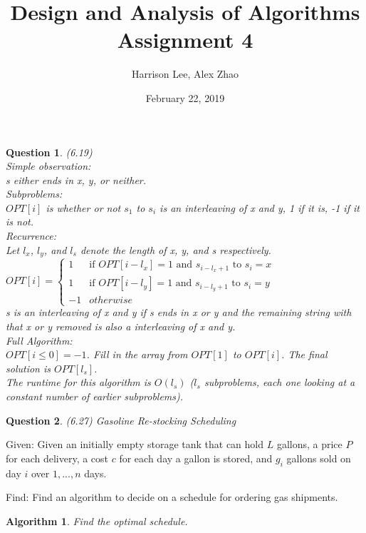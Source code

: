 \documentclass[11pt, oneside]{article}   	%
\title {Design and Analysis of Algorithms Assignment 4}
\author{Harrison Lee, Alex Zhao}
\date{February 22, 2019}
\newtheorem{Question}{Question}
\newtheorem{Algorithm}{Algorithm}
\begin{document}
\maketitle

\begin{Question} (6.19) \smallskip \\
Simple observation:  \\
s either ends in x, y, or neither. \bigskip \\
Subproblems: \\
$OPT[i]$ is whether or not $s_1$ to $s_i$ is an interleaving of x and y, 1 if it is, -1 if it is not. \bigskip \\
Recurrence: \\
Let $l_x$, $l_y$, and $l_s$ denote the length of x, y, and s respectively. \smallskip \\
$OPT[i]=
\begin{cases}
    1 &\text{if } OPT[i-l_x]=1 \text{ and } s_{i-l_x+1} \text{ to } s_i=x\\
    1 &\text{if } OPT[i-l_y]=1 \text{ and } s_{i-l_y+1} \text{ to } s_i=y\\
    -1 & otherwise
\end{cases}
$\smallskip \\
s is an interleaving of x and y if s ends in x or y and the remaining string with that x or y removed is also a interleaving of x and y.\bigskip \\
Full Algorithm:\\
$OPT[i\leq 0]=-1$. Fill in the array from $OPT[1]$ to $OPT[i]$. The final solution is $OPT[l_s]$. \smallskip \\
The runtime for this algorithm is $O(l_s)$ ($l_s$ subproblems, each one looking at a constant number of earlier subproblems). 
\end{Question}

\newpage
\linespread{1.1}
\begin{Question} (6.27) Gasoline Re-stocking Scheduling
\end{Question}


\noindent Given: Given an initially empty storage tank that can hold $L$ gallons, a price $P$ for each delivery, a cost $c$ for each day a gallon is stored, and $g_i$ gallons sold on day $i$ over $1,...,n$ days.

\noindent Find: Find an algorithm to decide on a schedule for ordering gas shipments.

\begin{Algorithm}
Find the optimal schedule.
\end{Algorithm}
\end{document}
